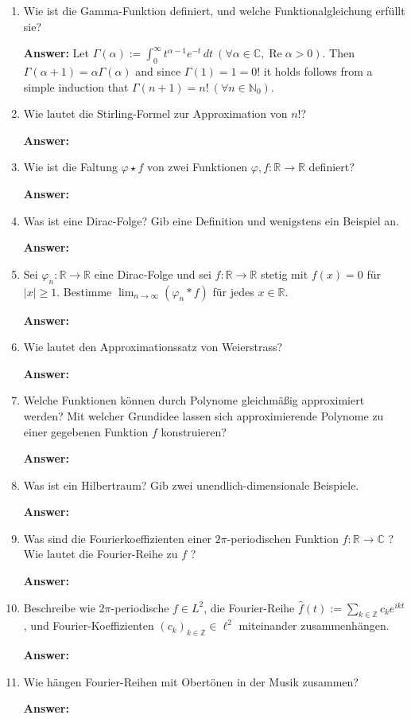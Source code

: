 \documentclass[11pt]{article}
\newcommand{\abs}[1]{\left|#1\right|}
\newcommand{\RR}[0]{\mathbb{R}}
\newcommand{\CC}[0]{\mathbb{C}}
\newcommand{\ZZ}[0]{\mathbb{Z}}
\newcommand{\NN}[0]{\mathbb{N}}
\renewcommand{\Re}[0]{\operatorname{Re}}
\begin{document}
\begin{enumerate}
    \item Wie ist die Gamma-Funktion definiert, und welche Funktionalgleichung erfüllt sie?

    \textbf{Answer:} Let $\Gamma(\alpha) := \int_0^\infty t^{\alpha -1} e^{-t}\,dt~(\forall \alpha \in \CC, \Re\alpha > 0)$. Then $\Gamma(\alpha + 1) = \alpha \Gamma(\alpha)$ and since $\Gamma(1) = 1 = 0!$ it holds follows from a simple induction that $\Gamma(n+1) = n!~(\forall n \in \NN_0)$.
    \item Wie lautet die Stirling-Formel zur Approximation von $n!$?

    \textbf{Answer:}
    \item Wie ist die Faltung $\varphi \star f$ von zwei Funktionen $\varphi, f: \RR \to \RR$ definiert?

    \textbf{Answer:}
    \item Was ist eine Dirac-Folge? Gib eine Definition und wenigstens ein Beispiel an.

    \textbf{Answer:}
    \item Sei $\varphi_n: \RR \to \RR$ eine Dirac-Folge und sei $f: \RR \to \RR$ stetig mit $f(x) = 0$ für $\abs{x} \ge 1$. Bestimme $\lim_{n\to\infty} (\varphi_n * f)$  für jedes $x \in \RR$.

    \textbf{Answer:}
    \item Wie lautet den Approximationssatz von Weierstrass?

    \textbf{Answer:}
    \item Welche Funktionen können durch Polynome gleichmäßig approximiert werden? Mit welcher Grundidee lassen sich approximierende Polynome zu einer gegebenen Funktion $f$ konstruieren?

    \textbf{Answer:}
    \item Was ist ein Hilbertraum? Gib zwei unendlich-dimensionale Beispiele.

    \textbf{Answer:}
    \item Was sind die Fourierkoeffizienten einer $2\pi$-periodischen Funktion $f: \RR \to \CC$ ? Wie lautet die Fourier-Reihe zu $f$ ?

    \textbf{Answer:}
    \item Beschreibe wie $2\pi$-periodische $f \in L^2$, die Fourier-Reihe $\hat{f}(t) := \sum_{k\in\ZZ}{c_k e^{ikt}}$, und Fourier-Koeffizienten $(c_k)_{k \in \ZZ} \in \ell^2$ miteinander zusammenhängen.

    \textbf{Answer:}
    \item Wie hängen Fourier-Reihen mit Obertönen in der Musik zusammen?

    \textbf{Answer:}

\end{enumerate}
\end{document}
